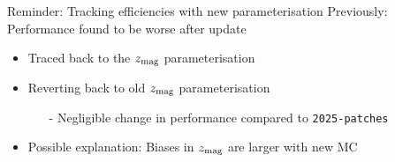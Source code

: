 \documentclass[xcolor={dvipsnames}]{beamer}
\begin{document}
\begin{frame}{Reminder: Tracking efficiencies with new parameterisation}
  \vspace{0.0cm}
  {\Large Previously: Performance found to be worse after update}
  \vspace{0.5cm}
  \begin{itemize}
    \setlength\itemsep{1.0em}
    \item{Traced back to the $z_{\rm mag}$ parameterisation}
    \item{Reverting back to old $z_{\rm mag}$ parameterisation}
    \begin{itemize}
      \item[-]{Negligible change in performance compared to \texttt{2025-patches}}
    \end{itemize}
    \item{Possible explanation: Biases in $z_{\rm mag}$ are larger with new MC}
  \end{itemize}
\end{frame}
\end{document}
